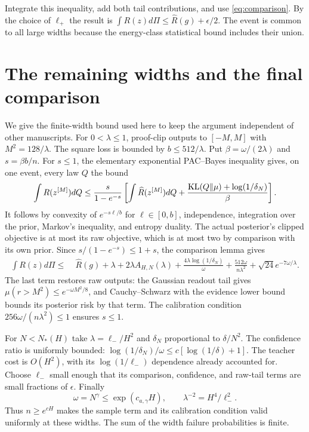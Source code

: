 \documentclass[11pt]{article}
\begin{document}
Integrate this inequality, add both tail contributions, and use \eqref{eq:comparison}. By the choice of $\ell_+$ the result is
$\int R(z)d\Pi\le\widehat R(g)+\epsilon/2$.
The event is common to all large widths because the energy-class statistical bound includes their union.

\section{The remaining widths and the final comparison}
We give the finite-width bound used here to keep the argument independent of other manuscripts. For $0<\lambda\le1$, proof-clip outputs to $[-M,M]$ with $M^2=128/\lambda$. The square loss is bounded by $b\le512/\lambda$. Put $\beta=\omega/(2\lambda)$ and $s=\beta b/n$. For $s\le1$, the elementary exponential PAC--Bayes inequality gives, on one event, every law $Q$ the bound
\[
 \int R(z^{[M]})dQ\le\frac{s}{1-e^{-s}}
 \left[\int\widehat R(z^{[M]})dQ+
          \frac{\operatorname{KL}(Q\Vert\mu)+\log(1/\delta_N)}\beta\right].
\]
It follows by convexity of $e^{-s\ell/b}$ for $\ell\in[0,b]$, independence, integration over the prior, Markov's inequality, and entropy duality. The actual posterior's clipped objective is at most its raw objective, which is at most two by comparison with its own prior. Since $s/(1-e^{-s})\le1+s$, the comparison lemma gives
\begin{align}
 \int R(z)d\Pi\le\;&\widehat R(g)+\lambda+2\lambda A_{H,N}(\lambda)
       +\frac{4\lambda\log(1/\delta_N)}\omega
       +\frac{512\omega}{n\lambda^2}
       +\sqrt{24}e^{-7\omega/\lambda}.
 \label{eq:finite-width}
\end{align}
The last term restores raw outputs: the Gaussian readout tail gives
$\mu(r>M^2)\le e^{-\omega M^2/8}$, and Cauchy--Schwarz with the evidence lower bound bounds its posterior risk by that term. The calibration condition $256\omega/(n\lambda^2)\le1$ ensures $s\le1$.

For $N<N_*(H)$ take $\lambda=\ell_-/H^2$ and $\delta_N$ proportional to $\delta/N^2$. The confidence ratio is uniformly bounded:
$\log(1/\delta_N)/\omega\le c[\log(1/\delta)+1]$.
The teacher cost is $O(H^2)$, with its $\log(1/\ell_-)$ dependence already accounted for. Choose $\ell_-$ small enough that its comparison, confidence, and raw-tail terms are small fractions of $\epsilon$. Finally
\[
 \omega=N^\gamma\le\exp(c_{a,\gamma}H),\qquad
 \lambda^{-2}=H^4/\ell_-^2.
\]
Thus $n\ge e^{cH}$ makes the sample term and its calibration condition valid uniformly at these widths. The sum of the width failure probabilities is finite.
\end{document}

